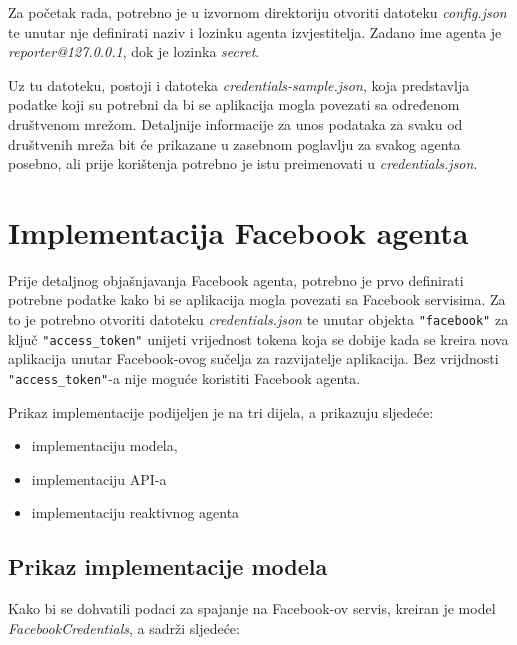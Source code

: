 \documentclass[a4paper,12pt]{foi}
\begin{document}
Za početak rada, potrebno je u izvornom direktoriju otvoriti datoteku \textit{config.json} te unutar nje definirati naziv i lozinku agenta izvjestitelja. Zadano ime agenta je \textit{reporter@127.0.0.1}, dok je lozinka \textit{secret}.

Uz tu datoteku, postoji i datoteka \textit{credentials-sample.json}, koja predstavlja podatke koji su potrebni da bi se aplikacija mogla povezati sa određenom društvenom mrežom. Detaljnije informacije za unos podataka za svaku od društvenih mreža bit će prikazane u zasebnom poglavlju za svakog agenta posebno, ali prije korištenja potrebno je istu preimenovati u \textit{credentials.json}.

\section{Implementacija Facebook agenta}

Prije detaljnog objašnjavanja Facebook agenta, potrebno je prvo definirati potrebne podatke kako bi se aplikacija mogla povezati sa Facebook servisima. 
Za to je potrebno otvoriti datoteku \textit{credentials.json} te unutar objekta \texttt{"facebook"} za ključ \texttt{"access\_token"} unijeti vrijednost tokena koja se dobije kada se kreira nova aplikacija unutar Facebook-ovog sučelja za razvijatelje aplikacija. Bez vrijdnosti \texttt{"access\_token"}-a nije moguće koristiti Facebook agenta.

Prikaz implementacije podijeljen je na tri dijela, a prikazuju sljedeće:

\begin{itemize}
\item{implementaciju modela,}
\item{implementaciju API-a}
\item{implementaciju reaktivnog agenta}
\end{itemize}

\subsection{Prikaz implementacije modela}

Kako bi se dohvatili podaci za spajanje na Facebook-ov servis, kreiran je model \textit{FacebookCredentials}, a sadrži sljedeće:

\lstset{commentstyle=\textit,language=python}

\end{document}
